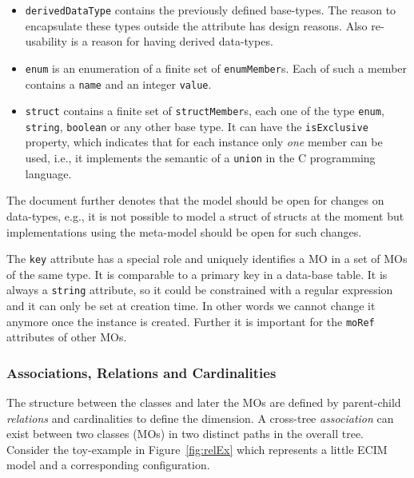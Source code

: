 \begin{itemize}
 \item \verb|derivedDataType| contains the previously defined base-types. The reason to encapsulate these types outside the attribute has design reasons. Also re-usability is a reason for having derived data-types.
 
 \item \verb|enum| is an enumeration of a finite set of \verb|enumMember|s. Each of such a member contains a \verb|name| and an integer \verb|value|.
 
 \item \verb|struct| contains a finite set of \verb|structMember|s, each one of the type \verb|enum|, \verb|string|, \verb|boolean| or any other base type. It can have the \verb|isExclusive| property, which indicates that for each instance only \emph{one} member can be used, i.e., it implements the semantic of a \verb|union| in the C programming language.
 
\end{itemize}

The document further denotes that the model should be open for changes on data-types, e.g., it is not possible to model a struct of structs at the moment but implementations using the meta-model should be open for such changes.

The \verb|key| attribute has a special role and uniquely identifies a MO in a set of MOs of the same type. It is comparable to a primary key in a data-base table. It is always a \verb|string| attribute, so it could be constrained with a regular expression and it can only be set at creation time. In other words we cannot change it anymore once the instance is created. Further it is important for the \verb|moRef| attributes of other MOs.


\subsubsection*{Associations, Relations and Cardinalities}

The structure between the classes and later the MOs are defined by parent-child \emph{relations} and cardinalities to define the dimension. A cross-tree \emph{association} can exist between two classes (MOs) in two distinct paths in the overall tree. Consider the toy-example in Figure~\ref{fig:relEx} which represents a little ECIM model and a corresponding configuration. \\

